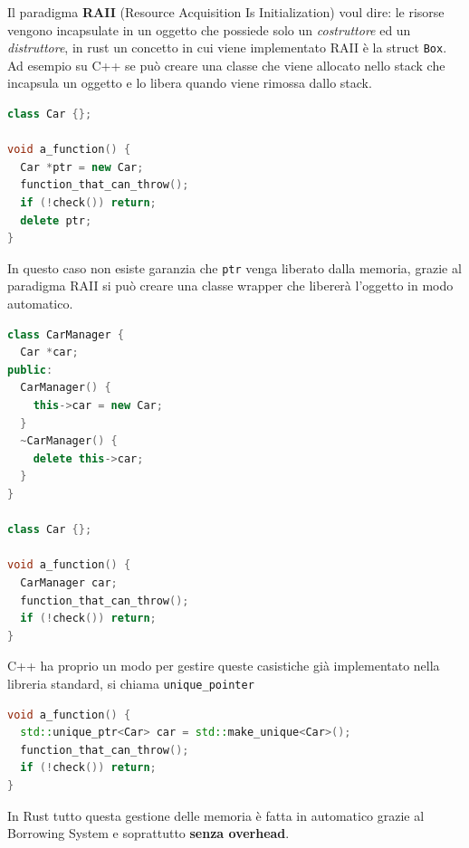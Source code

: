 \documentclass[12pt]{article}
\begin{document}
Il paradigma \textbf{RAII} (Resource Acquisition Is Initialization) voul dire: le risorse vengono incapsulate in un oggetto che possiede solo un \emph{costruttore} ed un \emph{distruttore}, in rust un concetto in cui viene implementato RAII \`e la struct \texttt{Box}. Ad esempio su C++ se pu\`o creare una classe che viene allocato nello stack che incapsula un oggetto e lo libera quando viene rimossa dallo stack.
\begin{lstlisting}[language=c++]
class Car {};

void a_function() {
  Car *ptr = new Car;
  function_that_can_throw();
  if (!check()) return;
  delete ptr;
}
\end{lstlisting}
In questo caso non esiste garanzia che \texttt{ptr} venga liberato dalla memoria, grazie al paradigma RAII si pu\`o creare una classe wrapper che liberer\`a l'oggetto in modo automatico.
\begin{lstlisting}[language=c++]
class CarManager {
  Car *car;
public:
  CarManager() {
    this->car = new Car;
  }
  ~CarManager() {
    delete this->car;
  }
}

class Car {};

void a_function() {
  CarManager car;
  function_that_can_throw();
  if (!check()) return;
}
\end{lstlisting}
C++ ha proprio un modo per gestire queste casistiche gi\`a implementato nella libreria standard, si chiama \texttt{unique\_pointer}
\begin{lstlisting}[language=c++]
void a_function() {
  std::unique_ptr<Car> car = std::make_unique<Car>();
  function_that_can_throw();
  if (!check()) return;
}
\end{lstlisting}
In Rust tutto questa gestione delle memoria \`e fatta in automatico grazie al Borrowing System e soprattutto \textbf{senza overhead}.
\end{document}
